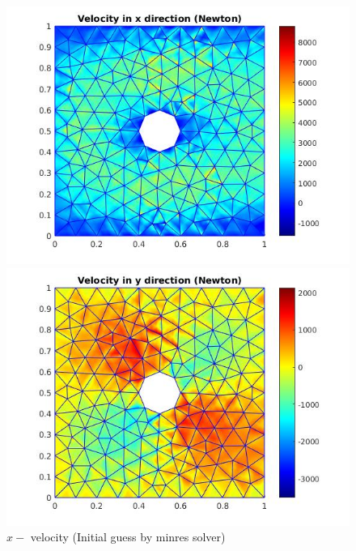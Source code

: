 \documentclass[a4paper]{book}
\begin{document}
\begin{figure}
  \begin{minipage}[c]{0.67\textwidth}
    \includegraphics[width=\textwidth]{cylinder_newton_vx_minres.jpg}
  \end{minipage}\hfill
  \begin{minipage}[c]{0.3\textwidth}
    \caption{$x-$ velocity (Initial guess by minres solver)}
  \label{x_vel_navier_stoke_minres}
  \end{minipage}
  \begin{minipage}[c]{0.67\textwidth}
    \includegraphics[width=\textwidth]{cylinder_newton_vy_minres.jpg}
  \end{minipage}\hfill
  \begin{minipage}[c]{0.3\textwidth}

\end{minipage}
\end{figure}
\end{document}

